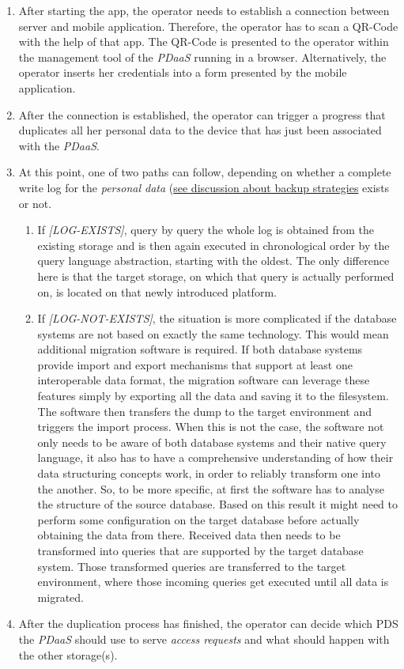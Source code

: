 \documentclass[12pt,english,a4paper,titlepage,cleardoublepage=empty,dottedtoc]{report}
\providecommand{\tightlist}{%
  \setlength{\itemsep}{0pt}\setlength{\parskip}{0pt}}
\begin{document}
\begin{enumerate}
\def\labelenumi{\arabic{enumi}.}
\item
  After starting the app, the operator needs to establish a connection
  between server and mobile application. Therefore, the operator has to
  scan a QR-Code with the help of that app. The QR-Code is presented to
  the operator within the management tool of the \emph{PDaaS} running in
  a browser. Alternatively, the operator inserts her credentials into a
  form presented by the mobile application.
\item
  After the connection is established, the operator can trigger a
  progress that duplicates all her personal data to the device that has
  just been associated with the \emph{PDaaS}.
\item
  At this point, one of two paths can follow, depending on whether a
  complete write log for the \emph{personal data}
  (\protect\hyperlink{data}{see discussion about backup strategies}
  exists or not.

  \begin{enumerate}
  \def\labelenumii{\alph{enumii})}
  \tightlist
  \item
    If \emph{{[}LOG-EXISTS{]}}, query by query the whole log is obtained
    from the existing storage and is then again executed in
    chronological order by the query language abstraction, starting with
    the oldest. The only difference here is that the target storage, on
    which that query is actually performed on, is located on that newly
    introduced platform.
  \item
    If \emph{{[}LOG-NOT-EXISTS{]}}, the situation is more complicated if
    the database systems are not based on exactly the same technology.
    This would mean additional migration software is required. If both
    database systems provide import and export mechanisms that support
    at least one interoperable data format, the migration software can
    leverage these features simply by exporting all the data and saving
    it to the filesystem. The software then transfers the dump to the
    target environment and triggers the import process. When this is not
    the case, the software not only needs to be aware of both database
    systems and their native query language, it also has to have a
    comprehensive understanding of how their data structuring concepts
    work, in order to reliably transform one into the another. So, to be
    more specific, at first the software has to analyse the structure of
    the source database. Based on this result it might need to perform
    some configuration on the target database before actually obtaining
    the data from there. Received data then needs to be transformed into
    queries that are supported by the target database system. Those
    transformed queries are transferred to the target environment, where
    those incoming queries get executed until all data is migrated.
  \end{enumerate}
\item
  After the duplication process has finished, the operator can decide
  which PDS the \emph{PDaaS} should use to serve \emph{access requests}
  and what should happen with the other storage(s).
\end{enumerate}
\end{document}
